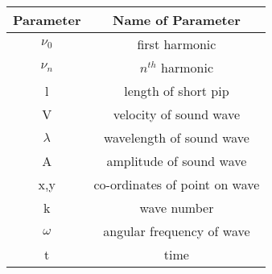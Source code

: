 \begin{tabular}{|c|c|}
        \hline
         Parameter & Name of Parameter  \\
        \hline
         $\nu_0$ & first harmonic \\
         \hline
          $\nu_n$ & $n^{th}$ harmonic \\
         \hline
         l & length of short pip \\
         \hline
         V & velocity of sound wave\\
         \hline
         $\lambda$ & wavelength of sound wave\\
         \hline
         A & amplitude of sound wave\\
         \hline
         x,y & co-ordinates of point on wave\\
         \hline
         k & wave number\\
         \hline
         $\omega$ & angular frequency of wave\\
         \hline
         t & time\\
         \hline
    \end{tabular}
